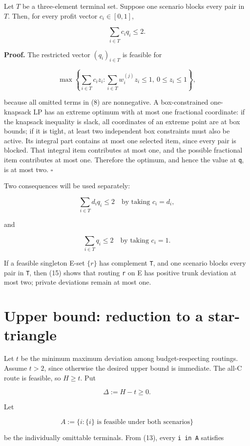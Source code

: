 \documentclass[
  11pt,
]{article}
\begin{document}
Let \(T\) be a three-element terminal set. Suppose one scenario blocks
every pair in \(T\). Then, for every profit vector \(c_i\in[0,1]\),

\[
\sum_{i\in T}c_iq_i\le2.
\tag{14}
\]

\textbf{Proof.} The restricted vector \((q_i)_{i\in T}\) is feasible for

\[
\max\left\{
\sum_{i\in T}c_i z_i:
\sum_{i\in T}w_i^{(j)}z_i\le1,
\ 0\le z_i\le1
\right\},
\]

because all omitted terms in (8) are nonnegative. A box-constrained
one-knapsack LP has an extreme optimum with at most one fractional
coordinate: if the knapsack inequality is slack, all coordinates of an
extreme point are at box bounds; if it is tight, at least two
independent box constraints must also be active. Its integral part
contains at most one selected item, since every pair is blocked. That
integral item contributes at most one, and the possible fractional item
contributes at most one. Therefore the optimum, and hence the value at
\texttt{q}, is at most two. \(\square\)

Two consequences will be used separately:

\[
\sum_{i\in T}d_iq_i\le2
\quad\text{by taking }c_i=d_i,
\tag{15}
\]

and

\[
\sum_{i\in T}q_i\le2
\quad\text{by taking }c_i=1.
\tag{16}
\]

If a feasible singleton E-set \(\{r\}\) has complement \texttt{T}, and
one scenario blocks every pair in \texttt{T}, then (15) shows that
routing \texttt{r} on E has positive trunk deviation at most two;
private deviations remain at most one.

\section{Upper bound: reduction to a
star-triangle}\label{upper-bound-reduction-to-a-star-triangle}

Let \(t\) be the minimum maximum deviation among budget-respecting
routings. Assume \(t>2\), since otherwise the desired upper bound is
immediate. The all-C route is feasible, so \(H\ge t\). Put

\[
\Delta:=H-t\ge0.
\tag{17}
\]

Let

\[
A:=\{i:\{i\}\text{ is feasible under both scenarios}\}
\]

be the individually omittable terminals. From (13), every
\texttt{i\ in\ A} satisfies
\end{document}
